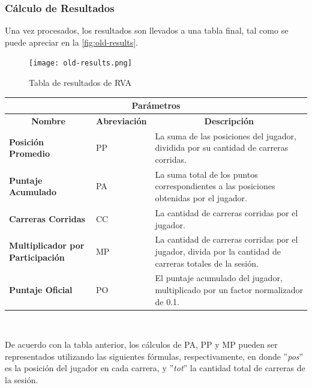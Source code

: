 \subsubsection{Cálculo de Resultados}
Una vez procesados, los resultados son llevados a una tabla final, tal como se puede apreciar en la \autoref{fig:old-results}.

\begin{figure}[H]
  \begin{center}
    \texttt{[image: old-results.png]}
  \end{center}
  \caption[Tabla de resultados de RVA]{Tabla de resultados de RVA}
  \label{fig:old-results}
\end{figure}

\begin{center}
	\begin{tabular}{ | p{5cm} | l | p{7cm} |}
		\hline
		\multicolumn{3}{|c|}{\textbf{Parámetros}} \\
		\hline
		\multicolumn{1}{|c|}{\textbf{Nombre}} & \multicolumn{1}{|c|}{\textbf{Abreviación}} & \multicolumn{1}{|c|}{\textbf{Descripción}} \\
		\hline
		{\textbf{Posición Promedio}} & PP & La suma de las posiciones del jugador, dividida por su cantidad de carreras corridas. \\ \hline
		{\textbf{Puntaje Acumulado}} & PA & La suma total de los puntos correspondientes a las posiciones obtenidas por el jugador. \\ \hline
		{\textbf{Carreras Corridas}} & CC & La cantidad de carreras corridas por el jugador. \\ \hline
		{\textbf{Multiplicador por Participación}} & MP & La cantidad de carreras corridas por el jugador, divida por la cantidad de carreras totales de la sesión. \\ \hline
		{\textbf{Puntaje Oficial}} & PO & El puntaje acumulado del jugador, multiplicado por un factor normalizador de 0.1. \\ \hline
	\end{tabular}
  \\
  \label{table:parameters}
\end{center}

De acuerdo con la tabla anterior, los cálculos de PA, PP y MP pueden ser representados utilizando las siguientes fórmulas, respectivamente, en donde ''\textit{pos}'' es la posición del jugador en cada carrera, y ''\textit{tot}'' la cantidad total de carreras de la sesión.

